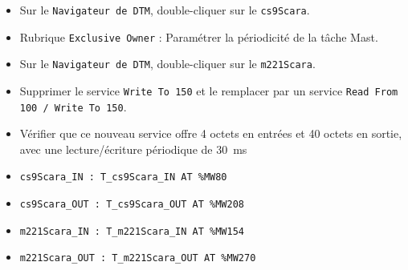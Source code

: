 \begin{UPSTIConfiguration}
    \begin{itemize}
        \item Sur le \texttt{Navigateur de DTM}, double-cliquer sur le \texttt{cs9Scara}.
        \item Rubrique \texttt{Exclusive Owner} : Paramétrer la périodicité de la tâche Mast. 
    \end{itemize}
    \begin{itemize}
        \item Sur le \texttt{Navigateur de DTM}, double-cliquer sur le \texttt{m221Scara}.
        \item Supprimer le service \texttt{Write To 150} et le remplacer par un service \texttt{Read From 100 / Write To 150}. 
        \item Vérifier que ce nouveau service offre 4 octets en entrées et 40 octets en sortie, avec une lecture/écriture périodique de \SI{30}{ms}
    \end{itemize}
\end{UPSTIConfiguration}

\begin{UPSTIVerification}
    \begin{itemize}[label=$\square$]
        \item \texttt{cs9Scara\_IN : T\_cs9Scara\_IN AT \%MW80}
        \item \texttt{cs9Scara\_OUT : T\_cs9Scara\_OUT AT \%MW208}
        \item \texttt{m221Scara\_IN : T\_m221Scara\_IN AT \%MW154}
        \item \texttt{m221Scara\_OUT : T\_m221Scara\_OUT AT \%MW270}
    \end{itemize}
\end{UPSTIVerification}

